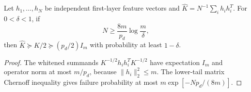 \begin{corollary}
\label{cor:empirical-first-layer-spectrum}
Let $h_1,\ldots,h_N$ be independent first-layer feature vectors and
$\widehat K=N^{-1}\sum_i h_i h_i^T$. For $0<\delta<1$, if
\[
 N\ge\frac{8m}{p_d}\log\frac m\delta,
\]
then $\widehat K\succeq K/2\succeq(p_d/2)I_m$ with probability
at least $1-\delta$.
\end{corollary}

\begin{proof}
The whitened summands $K^{-1/2}h_ih_i^TK^{-1/2}$ have expectation
$I_m$ and operator norm at most $m/p_d$, because
$\|h_i\|_2^2\le m$. The lower-tail matrix Chernoff inequality gives
failure probability at most $m\exp[-Np_d/(8m)]$.
\end{proof}
